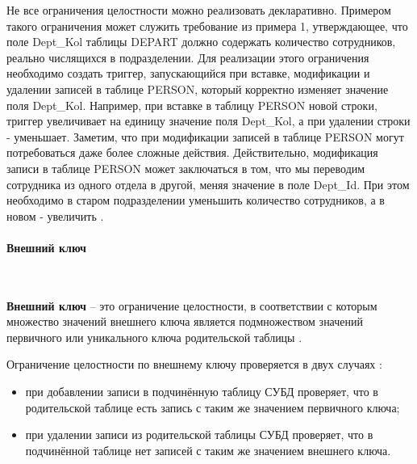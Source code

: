 Не все ограничения целостности можно реализовать декларативно. Примером такого ограничения может служить требование из примера 1, утверждающее, что поле Dept\_Kol таблицы DEPART должно содержать количество сотрудников, реально числящихся в подразделении. Для реализации этого ограничения необходимо создать триггер, запускающийся при вставке, модификации и удалении записей в таблице PERSON, который корректно изменяет значение поля Dept\_Kol. Например, при вставке в таблицу PERSON новой строки, триггер увеличивает на единицу значение поля Dept\_Kol, а при удалении строки - уменьшает. Заметим, что при модификации записей в таблице PERSON могут потребоваться даже более сложные действия. Действительно, модификация записи в таблице PERSON может заключаться в том, что мы переводим сотрудника из одного отдела в другой, меняя значение в поле Dept\_Id. При этом необходимо в старом подразделении уменьшить количество сотрудников, а в новом - увеличить \autocite{TransCit}.
\paragraph{Внешний ключ} ~\\
\begin{grayquote}
\textbf{Внешний ключ} – это ограничение целостности, в соответствии с которым
множество значений внешнего ключа является подмножеством значений
первичного или уникального ключа родительской таблицы \autocite{Karpova2009}.
\end{grayquote}

Ограничение целостности по внешнему ключу проверяется в двух случаях \autocite{Karpova2009}:
\begin{itemize}
    \item при добавлении записи в подчинённую таблицу СУБД проверяет, что в
родительской таблице есть запись с таким же значением первичного
ключа;
    \item при удалении записи из родительской таблицы СУБД проверяет, что в
подчинённой таблице нет записей с таким же значением внешнего ключа. 
\end{itemize}

